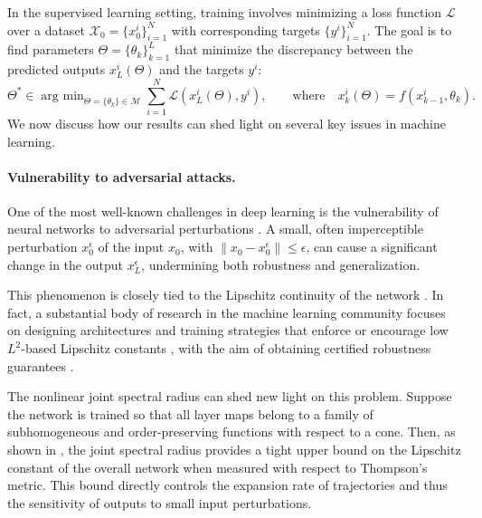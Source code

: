 \documentclass{article}
\DeclareMathOperator*{\argmin}{arg\:min}
\begin{document}
In the supervised learning setting, training involves minimizing a loss function $\mathcal{L}$ over a dataset $\mathcal{X}_0 = \{x_0^i\}_{i=1}^N$ with corresponding targets $\{y^i\}_{i=1}^N$. The goal is to find parameters $\Theta = \{\theta_k\}_{k=1}^L$ that minimize the discrepancy between the predicted outputs $x_L^i(\Theta)$ and the targets $y^i$:
\begin{equation}
 \Theta^* \in \argmin_{\Theta = \{\theta_k\} \in \mathcal{M}} \sum_{i=1}^N \mathcal{L}(x_L^i(\Theta), y^i), \qquad \text{where} \quad x_k^i(\Theta) = f(x_{k-1}^i, \theta_k).
\end{equation}
We now discuss how our results can shed light on several key issues in machine learning.

\paragraph{Vulnerability to adversarial attacks.}
One of the most well-known challenges in deep learning is the vulnerability of neural networks to adversarial perturbations \cite{biggio2013evasion, goodfellow2014explaining}. A small, often imperceptible perturbation $x_0^\epsilon$ of the input $x_0$, with $\|x_0 - x_0^\epsilon\| \leq \epsilon$, can cause a significant change in the output $x_L^\epsilon$, undermining both robustness and generalization.

This phenomenon is closely tied to the Lipschitz continuity of the network \cite{goodfellow_intr_properties, parseval, tsuzuku2018lipschitz, hein2017formal}. In fact, a substantial body of research in the machine learning community focuses on designing architectures and training strategies that enforce or encourage low $L^2$-based Lipschitz constants \cite{tsuzuku2018lipschitz, trockmanorthogonalizing, leino2021globally, savostianova2023robust}, with the aim of obtaining certified robustness guarantees \cite{hein2017formal, singlaimproved, meunier2022dynamical}. 

The nonlinear joint spectral radius can shed new light on this problem. Suppose the network is trained so that all layer maps belong to a family of subhomogeneous and order-preserving functions with respect to a cone. Then, as shown in , the joint spectral radius provides a tight upper bound on the Lipschitz constant of the overall network when measured with respect to Thompson’s metric. This bound directly controls the expansion rate of trajectories and thus the sensitivity of outputs to small input perturbations.
\end{document}
